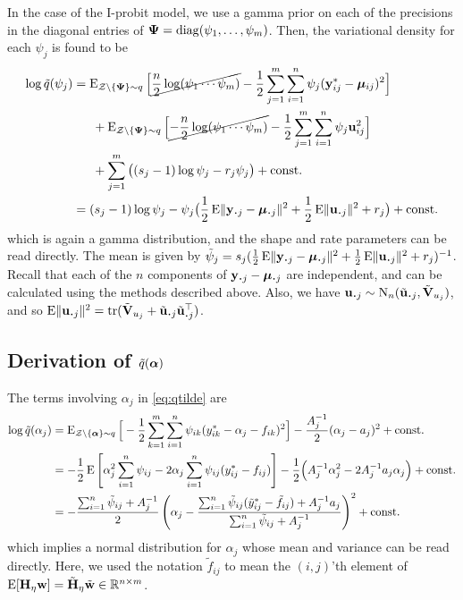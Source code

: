 In the case of the I-probit model, we use a gamma prior on each of the precisions in the diagonal entries of $\bPsi=\diag(\psi_1,\dots,\psi_m)$.
Then, the variational density for each $\psi_j$ is found to be
\begin{align*}
  \log \tilde q(\psi_j)
  &= \E_{\cZ\backslash\{\bPsi\}\sim q} \Big[ 
  \cancel{\half[n]\log (\psi_1\cdots\psi_m)} - \half\sum_{j=1}^m \sum_{i=1}^n \psi_j(\by^*_{ij} - \bmu_{ij})^2 
  \Big] \\
  &\phantom{==} +\E_{\cZ\backslash\{\bPsi\}\sim q} \Big[ 
  \cancel{- \half[n]\log (\psi_1\cdots\psi_m)} - \half\sum_{j=1}^m \sum_{i=1}^n \psi_j \bu_{ij}^2 
  \Big] \\
  &\phantom{==} + \sum_{j=1}^m \big( (s_j - 1)\log \psi_j - r_j\psi_j \big) + \const \\
  &= (s_j - 1)\log \psi_j - \psi_j \big( \half \E\norm{\by_{\bigcdot j} -  \bmu_{\bigcdot j}}^2 + \half\E\norm{\bu_{\bigcdot j}}^2  + r_j \big) + \const
\end{align*}
which is again a gamma distribution, and the shape and rate parameters can be read directly.
The mean is given by $\tilde\psi_j = s_j(\half \E\norm{\by_{\bigcdot j} - \bmu_{\bigcdot j}}^2 + \half \E\norm{\bu_{\bigcdot j}}^2  + r_j)^{-1}$.
Recall that each of the $n$ components of $\by_{\bigcdot j} -  \bmu_{\bigcdot j}$ are independent, and can be calculated using the methods described above.
Also, we have $\bu_{\bigcdot j} \sim \N_n(\tilde\bu_{\bigcdot j}, \tilde\bV_{u_j})$, and so $  \E\norm{\bu_{\bigcdot j}}^2 = \tr(\tilde\bV_{u_j} + \tilde\bu_{\bigcdot j}\tilde\bu_{\bigcdot j}^\top)$.

\subsection{Derivation of \texorpdfstring{$\tilde q(\balpha)$}{$\tilde q(\alpha)$}}

The terms involving $\alpha_j$ in \cref{eq:qtilde} are
\begin{align*}
  \log \tilde q(\alpha_j)
  &= \E_{\cZ\backslash\{\balpha\}\sim q} \Big[ 
  -\half\sum_{k=1}^m \sum_{i=1}^n \psi_{ik}(y^*_{ik} - \alpha_j - f_{ik})^2 
  \Big] 
  - \frac{A_j^{-1}}{2} (\alpha_j - a_j)^2 + \const \\
  &= -\half\E \left[\alpha_j^2 \sum_{i=1}^n \psi_{ij}  - 2\alpha_j\sum_{i=1}^n \psi_{ij}(y^*_{ij} -  f_{ij}) \right]
  -\half\Big(A_j^{-1}\alpha_j^2 - 2A_j^{-1}a_j\alpha_j  \Big) + \const \\
  &=-\half[\sum_{i=1}^n \tilde\psi_{ij} + A_j^{-1}] \left( 
  \alpha_j - 
  \frac{\sum_{i=1}^n \tilde\psi_{ij}(\tilde y^*_{ij} -  \tilde f_{ij}) + A_j^{-1}a_j}{\sum_{i=1}^n \tilde\psi_{ij} + A_j^{-1}}  \right)^2 + \const
\end{align*}
which implies a normal distribution for $\alpha_j$ whose mean and variance can be read directly.
Here, we used the notation $\tilde f_{ij}$ to mean the $(i,j)$'th element of 
$\E[\bH_\eta\bw] = \tilde\bH_\eta \tilde \bw \in \bbR^{n\times m}$.

